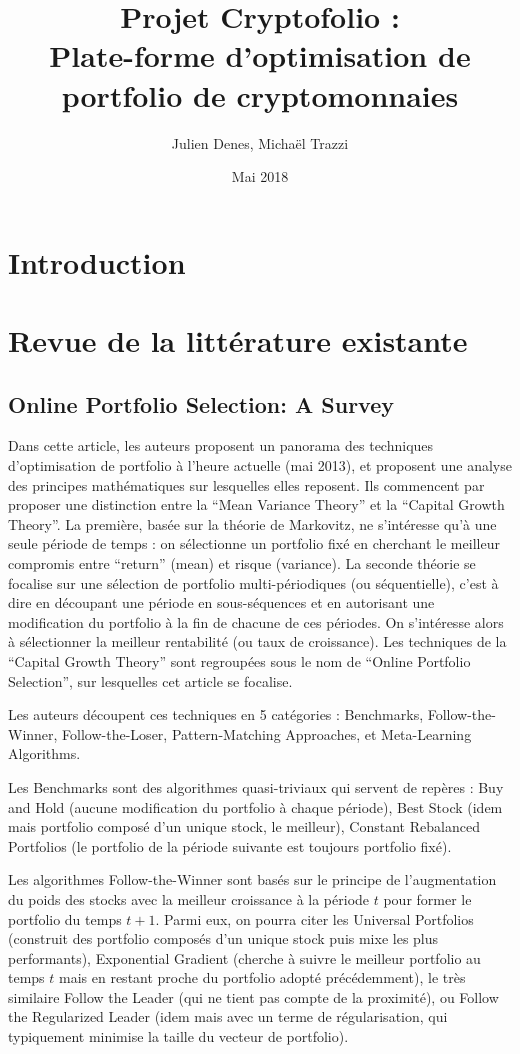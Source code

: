 \documentclass[a4paper]{article}
\title{Projet Cryptofolio :\\Plate-forme d'optimisation de portfolio de cryptomonnaies}
\author{Julien Denes, Michaël Trazzi}
\date{Mai 2018}
\begin{document}
\maketitle

\section*{Introduction}


\section{Revue de la littérature existante}

\subsection{Online Portfolio Selection: A Survey}

Dans cette article, les auteurs proposent un panorama des techniques d'optimisation de portfolio à l'heure actuelle (mai 2013), et proposent une analyse des principes mathématiques sur lesquelles elles reposent. Ils commencent par proposer une distinction entre la ``Mean Variance Theory'' et la ``Capital Growth Theory''. La première, basée sur la théorie de Markovitz, ne s'intéresse qu'à une seule période de temps : on sélectionne un portfolio fixé en cherchant le meilleur compromis entre ``return'' (mean) et risque (variance). La seconde théorie se focalise sur une sélection de portfolio multi-périodiques (ou séquentielle), c'est à dire en découpant une période en sous-séquences et en autorisant une modification du portfolio à la fin de chacune de ces périodes. On s'intéresse alors à sélectionner la meilleur rentabilité (ou taux de croissance). Les techniques de la ``Capital Growth Theory'' sont regroupées sous le nom de ``Online Portfolio Selection'', sur lesquelles cet article se focalise.

Les auteurs découpent ces techniques en 5 catégories : Benchmarks, Follow-the-Winner, Follow-the-Loser, Pattern-Matching Approaches, et Meta-Learning Algorithms.

Les Benchmarks sont des algorithmes quasi-triviaux qui servent de repères : Buy and Hold (aucune modification du portfolio à chaque période), Best Stock (idem mais portfolio composé d'un unique stock, le meilleur), Constant Rebalanced Portfolios (le portfolio de la période suivante est toujours portfolio fixé).

Les algorithmes Follow-the-Winner sont basés sur le principe de l'augmentation du poids des stocks avec la meilleur croissance à la période $t$ pour former le portfolio du temps $t+1$. Parmi eux, on pourra citer les Universal Portfolios (construit des portfolio composés d'un unique stock puis mixe les plus performants), Exponential Gradient (cherche à suivre le meilleur portfolio au temps $t$ mais en restant proche du portfolio adopté précédemment), le très similaire Follow the Leader (qui ne tient pas compte de la proximité), ou Follow the Regularized Leader (idem mais avec un terme de régularisation, qui typiquement minimise la taille du vecteur de portfolio).
\end{document}

